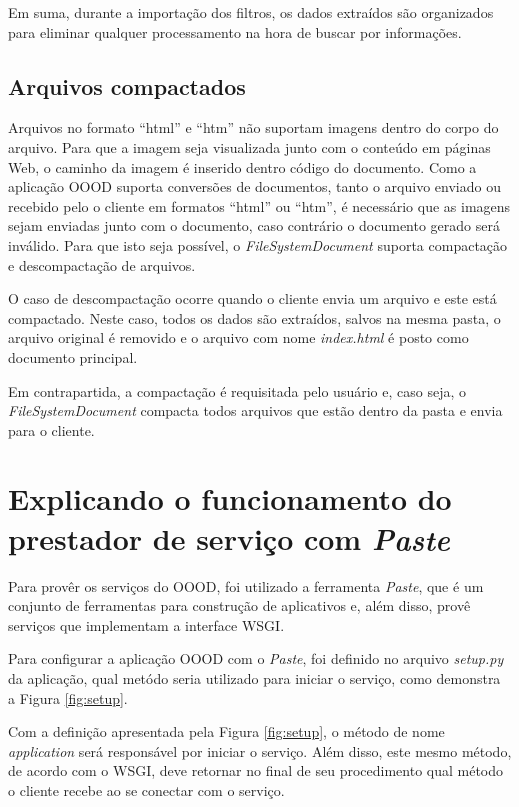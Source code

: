 Em suma, durante a importação dos filtros, os dados extraídos são organizados para eliminar qualquer processamento na hora de buscar por informações.

\subsection{Arquivos compactados}

Arquivos no formato ``html'' e ``htm'' não suportam imagens dentro do corpo do arquivo. Para que a imagem seja visualizada junto com o conteúdo em páginas Web, o caminho da imagem é inserido dentro código do documento. Como a aplicação OOOD suporta conversões de documentos, tanto o arquivo enviado ou recebido pelo o cliente em formatos ``html'' ou ``htm'', é necessário que as imagens sejam enviadas junto com o documento, caso contrário o documento gerado será inválido. Para que isto seja possível, o \textit{FileSystemDocument} suporta compactação e descompactação de arquivos.

O caso de descompactação ocorre quando o cliente envia um arquivo e este está compactado. Neste caso, todos os dados são extraídos, salvos na mesma pasta, o arquivo original é removido e o arquivo com nome \textit{index.html} é posto como documento principal.

Em contrapartida, a compactação é requisitada pelo usuário e, caso seja, o \textit{FileSystemDocument} compacta todos arquivos que estão dentro da pasta e envia para o cliente.

\section{Explicando o funcionamento do prestador de serviço com \textit{Paste}}

Para provêr os serviços do OOOD, foi utilizado a ferramenta \textit{Paste}, que é um conjunto de ferramentas para construção de aplicativos e, além disso, provê serviços que implementam a interface WSGI.

Para configurar a aplicação OOOD com o \textit{Paste}, foi definido no arquivo \textit{setup.py} da aplicação, qual metódo seria utilizado para iniciar o serviço, como demonstra a Figura \ref{fig:setup}.

Com a definição apresentada pela Figura \ref{fig:setup}, o método de nome \textit{application} será responsável por iniciar o serviço. Além disso, este mesmo método, de acordo com o WSGI, deve retornar no final de seu procedimento qual método o cliente recebe ao se conectar com o serviço.

